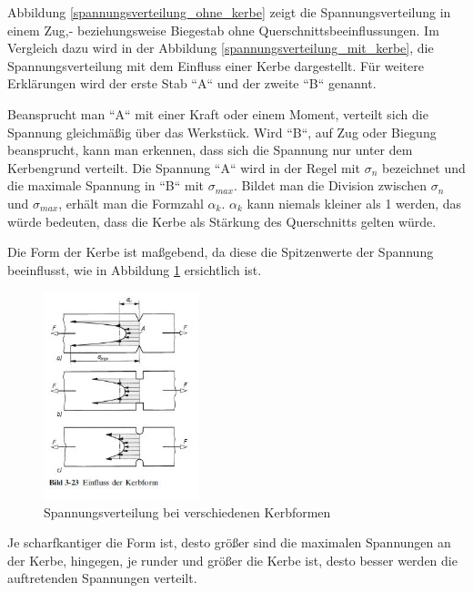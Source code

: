 	Abbildung \ref{spannungsverteilung_ohne_kerbe} zeigt die Spannungsverteilung in einem Zug,- beziehungsweise Biegestab ohne Querschnittsbeeinflussungen.
	Im Vergleich dazu wird in der Abbildung \ref{spannungsverteilung_mit_kerbe}, die Spannungsverteilung mit dem Einfluss einer Kerbe dargestellt.
	Für weitere Erklärungen wird der erste Stab “A“ und der zweite “B“ genannt.

	Beansprucht man “A“ mit einer Kraft oder einem Moment, verteilt sich die Spannung gleichmäßig über das Werkstück.
	Wird “B“, auf Zug oder Biegung beansprucht, kann man erkennen, dass sich die Spannung nur unter dem Kerbengrund verteilt.
	Die Spannung “A“ wird in der Regel mit $\sigma_{n}$ bezeichnet und die maximale Spannung in “B“ mit $\sigma_{max}$.
	Bildet man die Division zwischen $\sigma_{n}$ und $\sigma_{max}$, erhält man die Formzahl $\alpha_{k}$.
	$\alpha_{k}$ kann niemals kleiner als 1 werden, das würde bedeuten, dass die Kerbe als Stärkung des Querschnitts gelten würde.

	Die Form der Kerbe ist maßgebend, da diese die Spitzenwerte der Spannung beeinflusst, wie in Abbildung \ref{kerbform} ersichtlich ist.

			\begin{figure}[H]
			\begin{centering}
			\includegraphics[width = 0.4\textwidth]{Bilder/kerbform}
			\par\end{centering}
			\caption[Spannungsverteilung bei verschiedenen Kerbformen]{Spannungsverteilung bei verschiedenen Kerbformen\cite{kerbformen}}
			\label{kerbform}
			\end{figure}

	Je scharfkantiger die Form ist, desto größer sind die maximalen Spannungen an der Kerbe, hingegen, je runder und größer die Kerbe ist, desto besser werden die auftretenden Spannungen verteilt.

